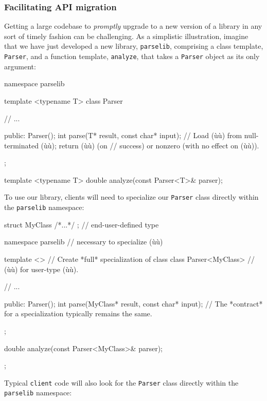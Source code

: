 \subsubsection[Facilitating API migration]{Facilitating API migration}\label{facilitating-api-migration}

Getting a large codebase to \emph{promptly} upgrade to a new version of
a library in any sort of timely fashion can be challenging. As a
simplistic illustration, imagine that we have just developed a new
library, \lstinline!parselib!, comprising a class template, \lstinline!Parser!,
and a function template, \lstinline!analyze!, that takes a \lstinline!Parser!
object as its only argument:

\begin{emcppslisting}[emcppsbatch=e2]
namespace parselib
{
    template <typename T>
    class Parser
    {
        // ...

    public:
        Parser();
        int parse(T* result, const char* input);
            // Load (ù{}ù) from null-terminated (ù{}ù); return (ù{}ù) (on
            // success) or nonzero (with no effect on (ù{}ù)).
    };

    template <typename T>
    double analyze(const Parser<T>& parser);
}
\end{emcppslisting}
    
\noindent To use our library, clients will need to specialize our \lstinline!Parser!
class directly within the \lstinline!parselib! namespace:

\begin{emcppslisting}[emcppsbatch=e2]
struct MyClass { /*...*/ };  // end-user-defined type

namespace parselib  // necessary to specialize (ù{}ù)
{
    template <>            // Create *full* specialization of class
    class Parser<MyClass>  // (ù{}ù) for user-type (ù{}ù).
    {
        // ...

    public:
        Parser();
        int parse(MyClass* result, const char* input);
            // The *contract* for a specialization typically remains the same.
    };

    double analyze(const Parser<MyClass>& parser);
};
\end{emcppslisting}
    
\noindent Typical \lstinline!client! code will also look for the \lstinline!Parser!
class directly within the \lstinline!parselib! namespace:

